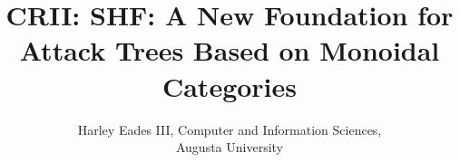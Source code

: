 \usepackage{amsmath,amssymb,amsthm}

\usepackage{fullpage}
\usepackage{hyperref}
\usepackage{color}
\usepackage[barr]{xy}
\usepackage{todonotes}
\usepackage{tikz}
\usepackage{tikz-qtree}
\usepackage{stmaryrd}
\usepackage{mathpartir}
\usepackage{layout}
\usepackage[margin=1.1in]{geometry}


\newtheorem{thm}{Theorem}
\newtheorem{lemma}[thm]{Lemma}
\newtheorem{corollary}[thm]{Corollary}
\newtheorem{definition}[thm]{Definition}
\newtheorem{remark}[thm]{Remark}
\newtheorem{proposition}[thm]{Proposition}
\newtheorem{notn}[thm]{Notation}
\newtheorem{observation}[thm]{Observation}

\newcommand{\cat}[1]{\mathbb{#1}}
\newcommand{\catobj}[1]{\mathsf{Obj}(\cat{#1})}
\newcommand{\catop}[1]{\mathbb{#1}^{\mathsf{op}}}
\newcommand{\sets}[0]{\mathsf{Sets}}
\newcommand{\homs}[2]{\mathsf{Hom}[#1,#2]}
\newcommand{\cur}[0]{\mathsf{cur}}
\newcommand{\curi}[0]{\mathsf{cur}^{-1}}
\newcommand{\app}[0]{\mathsf{app}}
\newcommand{\id}[0]{\mathsf{id}}
\newcommand{\injl}[0]{\mathsf{inj_l}}
\newcommand{\injr}[0]{\mathsf{inj_r}}
\newcommand{\pow}[1]{\mathcal{P}(#1)}
\newcommand{\cpy}[0]{\textcopyright}
\newcommand{\lett}[3]{\mathsf{let}\,#1 = #2\,\mathsf{in}\,#3}



\title{\vspace{-50px}CRII: SHF: A New Foundation for Attack Trees Based on Monoidal Categories}
\author{Harley Eades III, Computer and Information Sciences, \\Augusta University}
\date{\vspace{-22px}}

\maketitle  

